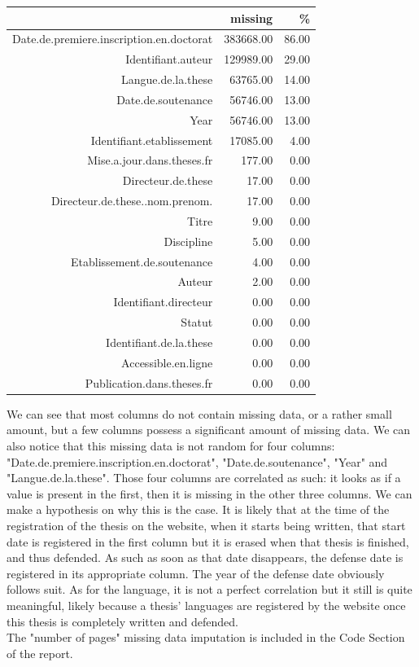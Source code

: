 \documentclass[12pt]{article}
\begin{document}
\begin{table}[ht]
\centering
\begin{tabular}{rrr}
  \hline
 & missing & \% \\ 
  \hline
Date.de.premiere.inscription.en.doctorat & 383668.00 & 86.00 \\ 
  Identifiant.auteur & 129989.00 & 29.00 \\ 
  Langue.de.la.these & 63765.00 & 14.00 \\ 
  Date.de.soutenance & 56746.00 & 13.00 \\ 
  Year & 56746.00 & 13.00 \\ 
  Identifiant.etablissement & 17085.00 & 4.00 \\ 
  Mise.a.jour.dans.theses.fr & 177.00 & 0.00 \\ 
  Directeur.de.these & 17.00 & 0.00 \\ 
  Directeur.de.these..nom.prenom. & 17.00 & 0.00 \\ 
  Titre & 9.00 & 0.00 \\ 
  Discipline & 5.00 & 0.00 \\ 
  Etablissement.de.soutenance & 4.00 & 0.00 \\ 
  Auteur & 2.00 & 0.00 \\ 
  Identifiant.directeur & 0.00 & 0.00 \\ 
  Statut & 0.00 & 0.00 \\ 
  Identifiant.de.la.these & 0.00 & 0.00 \\ 
  Accessible.en.ligne & 0.00 & 0.00 \\ 
  Publication.dans.theses.fr & 0.00 & 0.00 \\ 
   \hline
\end{tabular}
\end{table}

We can see that most columns do not contain missing data, or a rather small amount, but a few columns possess a significant amount of missing data. We can also notice that this missing data is not random for four columns: "Date.de.premiere.inscription.en.doctorat", "Date.de.soutenance", "Year" and "Langue.de.la.these". Those four columns are correlated as such: it looks as if a value is present in the first, then it is missing in the other three columns. We can make a hypothesis on why this is the case. It is likely that at the time of the registration of the thesis on the website, when it starts being written, that start date is registered in the first column but it is erased when that thesis is finished, and thus defended. As such as soon as that date disappears, the defense date is registered in its appropriate column. The year of the defense date obviously follows suit. As for the language, it is not a perfect correlation but it still is quite meaningful, likely because a thesis' languages are registered by the website once this thesis is completely written and defended. \\
The "number of pages" missing data imputation is included in the Code Section of the report.
\end{document}
